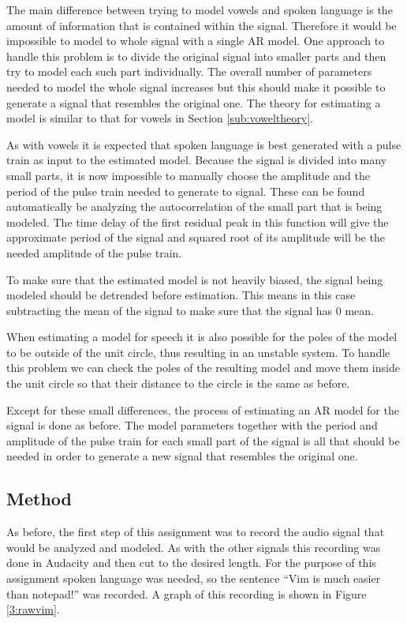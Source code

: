 \documentclass{IEEEtran}
\begin{document}
The main difference between trying to model vowels and spoken language
is the amount of information that is contained within the signal.
Therefore it would be impossible to model to whole signal with a
single AR model. One approach to handle this problem is to divide
the original signal into smaller parts and then try to model each such
part individually. The overall number of parameters needed to model the
whole signal increases but this should make it possible to generate a
signal that resembles the original one. The theory for estimating a
model is similar to that for vowels in Section \ref{sub:voweltheory}.

As with vowels it is expected that spoken language is best generated
with a pulse train as input to the estimated model. Because the signal
is divided into many small parts, it is now impossible to manually choose
the amplitude and the period of the pulse train needed to generate to
signal. These can be found automatically be analyzing the autocorrelation
of the small part that is being modeled. The time delay of the first
residual peak in this function will give the approximate period of the
signal and squared root of its amplitude will be the needed amplitude of
the pulse train.

To make sure that the estimated model is not heavily biased, the signal
being modeled should be detrended before estimation. This means in this
case subtracting the mean of the signal to make sure that the
signal has $0$ mean.

When estimating a model for speech it is also possible for the poles
of the model to be outside of the unit circle, thus resulting in an
unstable system. To handle this problem we can check the poles of the
resulting model and move them inside the unit circle so that their
distance to the circle is the same as before.

Except for these small differences, the process of estimating an AR
model for the signal is done as before. The model parameters together
with the period and amplitude of the pulse train for each small part
of the signal is all that should be needed in order to generate a new
signal that resembles the original one.

\subsection{Method}
As before, the first step of this assignment was to record the audio
signal that would be analyzed and modeled. As with the other signals
this recording was done in Audacity \cite{audacity} and then cut to
the desired length. For the purpose of this assignment spoken language
was needed, so the sentence ``Vim is much easier than notepad!'' was
recorded. A graph of this recording is shown in Figure \ref{3:rawvim}.
\end{document}
